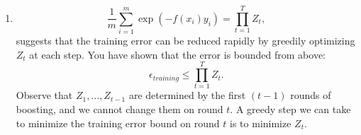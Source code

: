 \documentclass[english]{article}
\begin{document}
\begin{enumerate}
  {\em Hint}: Remember that $e^{\sum_i g_i}=\prod_i
  e^{g_i}$,$D_1(i)=\frac{1}{m}$, and that $\sum_i D_{t+1}(i) = 1$.

\begin{align*}
	&\;Expanding\; the\; above\; equation \; for \; D_{t+1} \\
	D_{t+1}(i) =&\; \dfrac{D_{t-1}(i) * e ^{-\alpha_t * y_i * h_t(x_i)} * e^{-\alpha_{t-1} * y_{i} * h_{t-1}(x_i)}}
				{Z_t * Z_{t-1}} \\
	&\;Expanding \; till \; D_1 \\
	=&\;\dfrac{D_1(i) *  e^ {-\alpha_t * y_i * h_t (x_i) } * e^{-\alpha_{t-1}*y_i*h_{t-1}(x_i)} \ldots e^{-\alpha_1 * y_i * h_1{x_i}}}
		       {Z_t * Z_{t-1} * Z_{t-1} \ldots * Z_1} \\
	=&\; \dfrac{e^{\sum_t {y_t * \alpha_t * h_t(x_i)}}}
		        {m * \prod_t{Z_t}} \\
	=&\;\dfrac{e^{-y_i \sum_t{\alpha_t h_t()x_i}}}
		      {m * \prod_t{Z_t}} \\
	&\;We \; know\; that f(x) = \sum_t {\alpha_t * h_t(x_i)} \\
	D_{t+1}(i) =&\; \dfrac {e^{-y_i f(x_i)}} {m * \prod_t Z_t} \\
	&\;Summing\; over\; all \; i \\
	\sum_i {D_{t+1}(i)} =&\; \dfrac {\sum_i {e^{-y_i * f(x_i)}}} {m * \prod_t {Z_t}} \\
	&\;We \; know \; \sum_i {D_{t+1}(i)} = 1 . Substituting \; and \; rearranging \\
	 \prod_t {Z_t} = &\; \sum_i {e^{-y_i * f(x_i)}} \\
\end{align*}


\item  \begin{equation} \frac{1}{m} \sum_{i=1}^m \exp( -f(x_i)
    y_i) = \prod_{t=1}^T Z_t,
  \end{equation}
 suggests that the
  training error can be reduced rapidly by greedily optimizing $Z_t$
  at each step.  You have shown that the error is bounded from above:
  \[
  \epsilon_{training} \leq \prod_{t=1}^T Z_t.
  \]
  Observe that $Z_1, \dots, Z_{t-1}$ are determined by the first
  $(t-1)$ rounds of boosting, and we cannot change them on round $t$.
  A greedy step we can take to minimize the training error bound on
  round $t$ is to minimize $Z_t$.


\end{enumerate}
\end{document}
